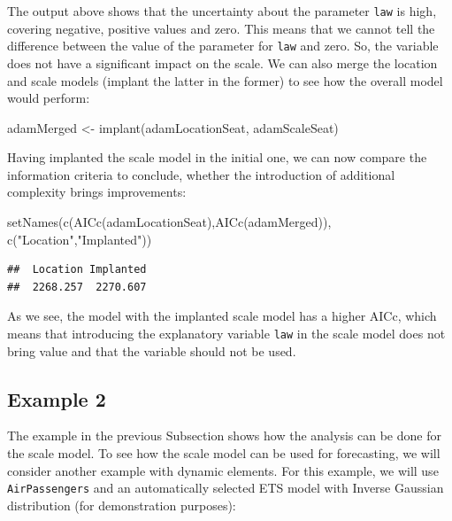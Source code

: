 \documentclass[
]{book}
\newenvironment{Shaded}{\begin{snugshade}}{\end{snugshade}}
\newcommand{\FunctionTok}[1]{\textcolor[rgb]{0.00,0.00,0.00}{#1}}
\newcommand{\NormalTok}[1]{#1}
\newcommand{\OtherTok}[1]{\textcolor[rgb]{0.56,0.35,0.01}{#1}}
\newcommand{\StringTok}[1]{\textcolor[rgb]{0.31,0.60,0.02}{#1}}
\theoremstyle{definition}
\theoremstyle{definition}
\theoremstyle{definition}
\theoremstyle{definition}
\theoremstyle{remark}
\begin{document}
The output above shows that the uncertainty about the parameter \texttt{law} is high, covering negative, positive values and zero. This means that we cannot tell the difference between the value of the parameter for \texttt{law} and zero. So, the variable does not have a significant impact on the scale. We can also merge the location and scale models (implant the latter in the former) to see how the overall model would perform:

\begin{Shaded}
\begin{Highlighting}[]
\NormalTok{adamMerged }\OtherTok{\textless{}{-}} \FunctionTok{implant}\NormalTok{(adamLocationSeat, adamScaleSeat)}
\end{Highlighting}
\end{Shaded}

Having implanted the scale model in the initial one, we can now compare the information criteria to conclude, whether the introduction of additional complexity brings improvements:

\begin{Shaded}
\begin{Highlighting}[]
\FunctionTok{setNames}\NormalTok{(}\FunctionTok{c}\NormalTok{(}\FunctionTok{AICc}\NormalTok{(adamLocationSeat),}\FunctionTok{AICc}\NormalTok{(adamMerged)),}
         \FunctionTok{c}\NormalTok{(}\StringTok{"Location"}\NormalTok{,}\StringTok{"Implanted"}\NormalTok{))}
\end{Highlighting}
\end{Shaded}

\begin{verbatim}
##  Location Implanted 
##  2268.257  2270.607
\end{verbatim}

As we see, the model with the implanted scale model has a higher AICc, which means that introducing the explanatory variable \texttt{law} in the scale model does not bring value and that the variable should not be used.

\hypertarget{example-2}{%
\subsection{Example 2}\label{example-2}}

The example in the previous Subsection shows how the analysis can be done for the scale model. To see how the scale model can be used for forecasting, we will consider another example with dynamic elements. For this example, we will use \texttt{AirPassengers} and an automatically selected ETS model with Inverse Gaussian distribution (for demonstration purposes):
\end{document}
